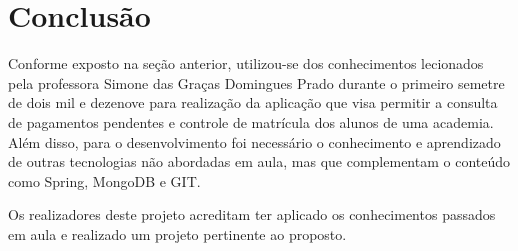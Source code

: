 \chapter{Conclusão}\label{cap_conclu}

Conforme exposto na seção anterior, utilizou-se dos conhecimentos lecionados pela professora Simone das Graças Domingues Prado durante o primeiro semetre de dois mil e dezenove para realização da aplicação que visa permitir a consulta de pagamentos pendentes e controle de matrícula dos alunos de uma academia. Além disso, para o desenvolvimento foi necessário o conhecimento e aprendizado de outras tecnologias não abordadas em aula, mas que complementam o conteúdo como Spring, MongoDB e GIT.

Os realizadores deste projeto acreditam ter aplicado os conhecimentos passados em aula e realizado um projeto pertinente ao proposto.